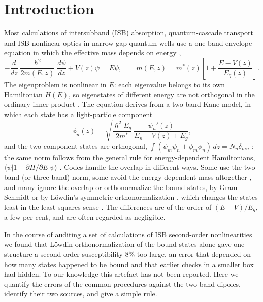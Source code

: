 \documentclass[11pt]{article}
\begin{document}
\section{Introduction}
Most calculations of intersubband (ISB) absorption, quantum-cascade transport and ISB nonlinear optics in narrow-gap quantum wells use a one-band envelope equation in which the effective mass depends on energy \cite{Nelson1987,Ekenberg1989,Sirtori1994,JirauschekKubis2014},
\begin{equation}
-\frac{d}{dz}\frac{\hslash^2}{2m(E,z)}\frac{d\psi}{dz}+V(z)\psi=E\psi,\qquad m(E,z)=m^*(z)\left[1+\frac{E-V(z)}{E_g(z)}\right].
\label{eq:H}
\end{equation}
The eigenproblem is nonlinear in $E$: each eigenvalue belongs to its own Hamiltonian $H(E)$, so eigenstates of different energy are not orthogonal in the ordinary inner product \cite{JirauschekKubis2014,Jonasson2016,Mohamed2024}. The equation derives from a two-band Kane model, in which each state has a light-particle component
\begin{equation}
\phi_n(z)=\sqrt{\frac{\hslash^2E_g}{2m^*}}\,\frac{\psi_n'(z)}{E_n-V(z)+E_g},
\label{eq:phi}
\end{equation}
and the two-component states are orthogonal, $\int(\psi_m\psi_n+\phi_m\phi_n)\,dz=N_n\delta_{mn}$ \cite{Sirtori1994,Mohamed2024}; the same norm follows from the general rule for energy-dependent Hamiltonians, $\langle\psi|1-\partial H/\partial E|\psi\rangle$ \cite{Formanek2004}. Codes handle the overlap in different ways. Some use the two-band (or three-band) norm, some avoid the energy-dependent mass altogether \cite{Jonasson2016}, and many ignore the overlap or orthonormalize the bound states, by Gram--Schmidt or by L\"owdin's symmetric orthonormalization \cite{Lowdin1950}, which changes the states least in the least-squares sense \cite{CarlsonKeller1957}. The differences are of the order of $(E-V)/E_g$, a few per cent, and are often regarded as negligible.

In the course of auditing a set of calculations of ISB second-order nonlinearities we found that L\"owdin orthonormalization of the bound states alone gave one structure a second-order susceptibility 8\% too large, an error that depended on how many states happened to be bound and that earlier checks in a smaller box had hidden. To our knowledge this artefact has not been reported. Here we quantify the errors of the common procedures against the two-band dipoles, identify their two sources, and give a simple rule.
\end{document}
